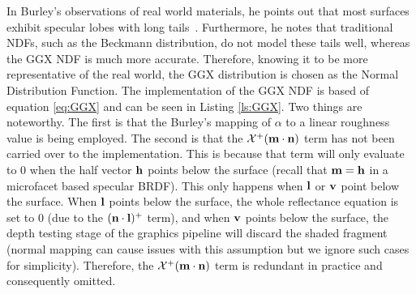 
In Burley's observations of real world materials, he points out that most surfaces exhibit specular lobes with long tails~\cite{Burley2012Physically}. Furthermore, he notes that traditional NDFs, such as the Beckmann distribution, do not model these tails well, whereas the GGX NDF is much more accurate. Therefore, knowing it to be more representative of the real world, the GGX distribution is chosen as the Normal Distribution Function. The implementation of the GGX NDF is based of equation \ref{eq:GGX} and can be seen in Listing \ref{ls:GGX}. Two things are noteworthy. The first is that the Burley's mapping of \begin{math}\alpha\end{math} to a linear roughness value is being employed. The second is that the \begin{math}\mathcal{X}^+(\mathbf{m}\cdot\mathbf{n})\end{math} term has not been carried over to the implementation. This is because that term will only evaluate to 0 when the half vector \begin{math}\mathbf{h}\end{math} points below the surface (recall that \begin{math}\mathbf{m} = \mathbf{h}\end{math} in a microfacet based specular BRDF). This only happens when \begin{math}\mathbf{l}\end{math} or \begin{math}\mathbf{v}\end{math} point below the surface. When \begin{math}\mathbf{l}\end{math} points below the surface, the whole reflectance equation is set to 0 (due to the \begin{math}(\mathbf{n}\cdot\mathbf{l})^+\end{math} term), and when \begin{math}\mathbf{v}\end{math} points below the surface, the depth testing stage of the graphics pipeline will discard the shaded fragment (normal mapping can cause issues with this assumption but we ignore such cases for simplicity). Therefore, the \begin{math}\mathcal{X}^+(\mathbf{m}\cdot\mathbf{n})\end{math} term is redundant in practice and consequently omitted.

